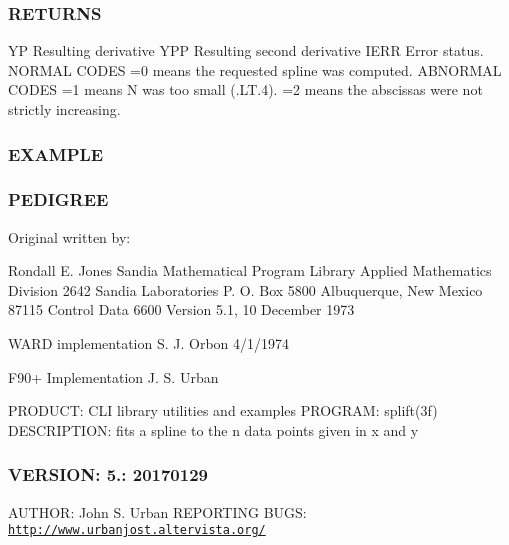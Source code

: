 \subsubsection*{R\+E\+T\+U\+R\+NS}

\begin{DoxyVerb}   YP     Resulting derivative
   YPP    Resulting second derivative
   IERR   Error status.
          NORMAL CODES
            =0  means the requested spline was computed.
          ABNORMAL CODES
            =1  means N was too small (.LT.4).
            =2  means the abscissas were not strictly increasing.
\end{DoxyVerb}


\subsubsection*{E\+X\+A\+M\+P\+LE}

\subsubsection*{P\+E\+D\+I\+G\+R\+EE}

\begin{DoxyVerb}Original written by:

  Rondall E. Jones
  Sandia Mathematical Program Library
  Applied Mathematics Division 2642
  Sandia Laboratories
  P. O. Box 5800
  Albuquerque, New Mexico  87115
  Control Data 6600 Version 5.1, 10 December 1973


  WARD implementation   S. J. Orbon        4/1/1974

  F90+ Implementation   J. S. Urban \end{DoxyVerb}


P\+R\+O\+D\+U\+CT\+: C\+LI library utilities and examples P\+R\+O\+G\+R\+AM\+: splift(3f) D\+E\+S\+C\+R\+I\+P\+T\+I\+ON\+: fits a spline to the n data points given in x and y \subsubsection*{V\+E\+R\+S\+I\+ON\+: 5.\+: 20170129}

A\+U\+T\+H\+OR\+: John S. Urban R\+E\+P\+O\+R\+T\+I\+NG B\+U\+GS\+: \href{http://www.urbanjost.altervista.org/}{\tt http\+://www.\+urbanjost.\+altervista.\+org/} \mbox{\label{namespacem__math_afb412a273368e2814058a8fc4197ba1a}} 
